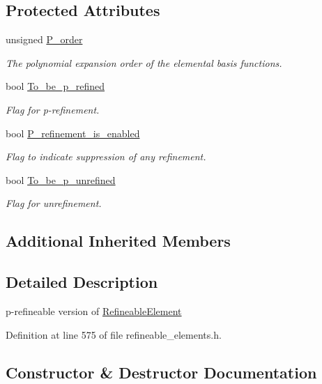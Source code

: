 \subsection*{Protected Attributes}
\begin{DoxyCompactItemize}
\item 
unsigned \hyperlink{classoomph_1_1PRefineableElement_a7d13c61af8c4b8a85b89340217ebdaf2}{P\+\_\+order}
\begin{DoxyCompactList}\small\item\em The polynomial expansion order of the elemental basis functions. \end{DoxyCompactList}\item 
bool \hyperlink{classoomph_1_1PRefineableElement_a79dbebfb2142f80c2d3095c9a060b873}{To\+\_\+be\+\_\+p\+\_\+refined}
\begin{DoxyCompactList}\small\item\em Flag for p-\/refinement. \end{DoxyCompactList}\item 
bool \hyperlink{classoomph_1_1PRefineableElement_acb52daa14da59b4770bc22fcf3f98d14}{P\+\_\+refinement\+\_\+is\+\_\+enabled}
\begin{DoxyCompactList}\small\item\em Flag to indicate suppression of any refinement. \end{DoxyCompactList}\item 
bool \hyperlink{classoomph_1_1PRefineableElement_a8b7f94da147a1639c4ba40464f768c32}{To\+\_\+be\+\_\+p\+\_\+unrefined}
\begin{DoxyCompactList}\small\item\em Flag for unrefinement. \end{DoxyCompactList}\end{DoxyCompactItemize}
\subsection*{Additional Inherited Members}


\subsection{Detailed Description}
p-\/refineable version of \hyperlink{classoomph_1_1RefineableElement}{Refineable\+Element} 

Definition at line 575 of file refineable\+\_\+elements.\+h.



\subsection{Constructor \& Destructor Documentation}
\mbox{\label{classoomph_1_1PRefineableElement_aeaac46015434fba4a9de7dc33073ff86}} 
